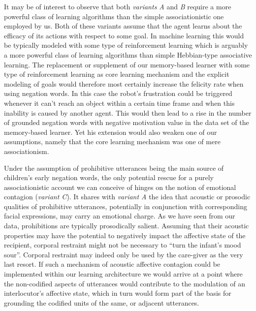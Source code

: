 It may be of interest to observe that both \emph{variants A} and \emph{B} require a more powerful class of learning algorithms than the simple associationistic one employed
by us. Both of these variants assume that the agent learns about the efficacy of its actions with respect to some goal. In machine learning this would be typically modeled
with some type of reinforcement learning which is arguably a more powerful class of learning algorithms than simple Hebbian-type associative learning.
The replacement or supplement of our memory-based learner with some type of reinforcement learning as core learning mechanism and the explicit modeling of goals would 
therefore most certainly increase the felicity rate when using negation words. In this case the robot's frustration could be triggered whenever it can't reach an object within 
a certain time frame and when this inability is caused by another agent. This would then lead to a rise in the number of grounded negation words with negative motivation value
in the data set of the memory-based learner. Yet his extension would also weaken one of our assumptions, namely that the core learning mechanism was one of mere associationism.

Under the assumption of prohibitive utterances being the main source of children's early negation words, the only potential rescue for a purely associationistic account we can 
conceive of hinges on the notion of emotional contagion \cite{Hatfield1993} (\emph{variant C}). It shares with \emph{variant A} the idea that acoustic or prosodic qualities of 
prohibitive utterances, potentially in conjunction with corresponding facial expressions, may carry an 
emotional charge. As we have seen from our data, prohibitions are typically prosodically salient. Assuming that their acoustic properties may have the potential to negatively 
impact the affective state of the recipient, corporal restraint might not be necessary to ``turn the infant's mood sour''. Corporal restraint may indeed only be used by the care-giver 
as the very last resort. If such a mechanism of acoustic affective contagion could be implemented within our learning architecture we would arrive at a point where the non-codified 
aspects of utterances would contribute to the modulation of an interlocutor's affective state, which in turn would form part of the basis for grounding the codified units of the same, 
or adjacent utterances. 

